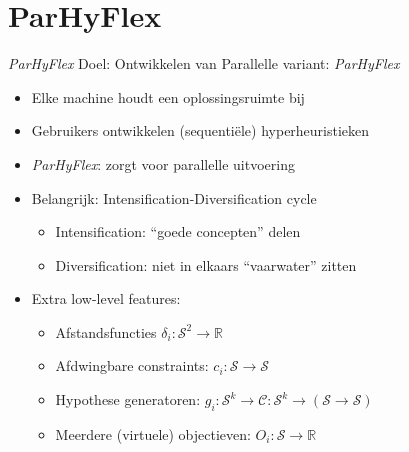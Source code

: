 \documentclass[handout]{beamer}
\newcommand{\sol}{\mathcal{S}}
\newcommand{\constr}{\mathcal{C}}
\newcommand{\RR}{\mathbb{R}}
\begin{document}
\section{ParHyFlex}
\begin{frame}{\emph{ParHyFlex}}
Doel: Ontwikkelen van Parallelle variant: \emph{ParHyFlex}
\begin{itemize}[<+->]
 \item Elke machine houdt een oplossingsruimte bij
 \item Gebruikers ontwikkelen (sequenti\"ele) hyperheuristieken
 \item \emph{ParHyFlex}: zorgt voor parallelle uitvoering
 \item Belangrijk: Intensification-Diversification cycle
 \begin{itemize}[<+->]
  \item Intensification: ``goede concepten'' delen
  \item Diversification: niet in elkaars ``vaarwater'' zitten
 \end{itemize}
 \item Extra low-level features:
 \begin{itemize}[<+->]
  \item Afstandsfuncties $\delta_i:\sol^2\rightarrow\RR$
  \item Afdwingbare constraints: $c_i:\sol\rightarrow\sol$
  \item Hypothese generatoren: $g_i:\sol^k\rightarrow\constr:\sol^k\rightarrow\left(\sol\rightarrow\sol\right)$
  \item Meerdere (virtuele) objectieven: $O_i:\sol\rightarrow\RR$
 \end{itemize}
\end{itemize}
\end{frame}
\end{document}
